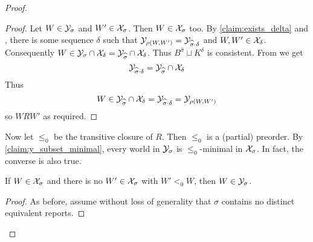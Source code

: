 \begin{proof}
\begin{proof}
        Let $W \in \mathcal{Y}_\sigma$ and $W' \in \mathcal{X}_\sigma$. Then $W \in \mathcal{X}_\sigma$
        too. By \cref{claim:exists_delta} and \rearr{}, there is
        some sequence $\delta$ such that $\mathcal{Y}_{\rho(W, W')} =
        \mathcal{Y}_{\widehat{\sigma} \cdot \delta}$ and $W, W' \in \mathcal{X}_\delta$.
        Consequently $W \in \mathcal{Y}_\sigma \cap \mathcal{X}_\delta = \mathcal{Y}_{\widehat{\sigma}}
        \cap \mathcal{X}_\delta$. Thus $B^{\widehat{\sigma}} \sqcup K^\delta$ is
        consistent. From \incvac{} we get
        \[
            \mathcal{Y}_{\widehat{\sigma} \cdot \delta} = \mathcal{Y}_{\widehat{\sigma}} \cap
            \mathcal{X}_\delta
        \]
        Thus
        \[
            W \in
            \mathcal{Y}_{\widehat{\sigma}} \cap \mathcal{X}_\delta
            = \mathcal{Y}_{\widehat{\sigma} \cdot \delta}
            = \mathcal{Y}_{\rho(W, W')}
        \]
        so $W R W'$ as required.
    \end{proof}

Now let $\le_0$ be the transitive closure of $R$. Then $\le_0$ is a (partial)
preorder. By \cref{claim:y_subset_minimal}, every world in $\mathcal{Y}_\sigma$ is
$\le_0$-minimal in $\mathcal{X}_\sigma$. In fact, the converse is also true.

    \begin{claim}
        \label{claim:minimal_subset_y}
        If $W \in \mathcal{X}_\sigma$ and there is no $W' \in \mathcal{X}_\sigma$ with $W' <_0
        W$, then $W \in \mathcal{Y}_\sigma$.
    \end{claim}
    \begin{proof}
        As before, assume without loss of generality that
        $\sigma$ contains no distinct equivalent reports.


\end{proof}
\end{proof}
